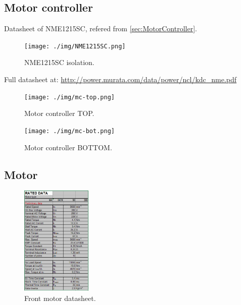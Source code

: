 \newcommand{\insertOnce}[1]{
	\ifundef{\once}{#1 \global\def\once{}}{}
}

\newcommand{\insertOnceReset}{
	\global\undef{\once}	
}

\newcommand{\addDsh}[5]{
		
	\insertOnceReset
}





\subsection{Motor controller}

Datasheet of NME1215SC, refered from \ref{sec:MotorController}.
\begin{figure}[H]
	\centering
	\texttt{[image: ./img/NME1215SC.png]}
	\caption{NME1215SC isolation.}
	\label{app:NME1215SC}
\end{figure}
Full datasheet at: \url{http://power.murata.com/data/power/ncl/kdc_nme.pdf}

\begin{figure}[H]
	\centering
	\texttt{[image: ./img/mc-top.png]}
	\caption{Motor controller TOP.}
	\label{app:mc-top}
\end{figure}

\begin{figure}[H]
	\centering
	\texttt{[image: ./img/mc-bot.png]}
	\caption{Motor controller BOTTOM.}
	\label{app:mc-bot}
\end{figure}

\subsection{Motor}

\begin{figure}[H]
	\centering
	\includegraphics[width=0.3\textwidth]{./img/app-mf.png}
	\caption{Front motor datasheet.}
	\label{app:mf}
\end{figure}

